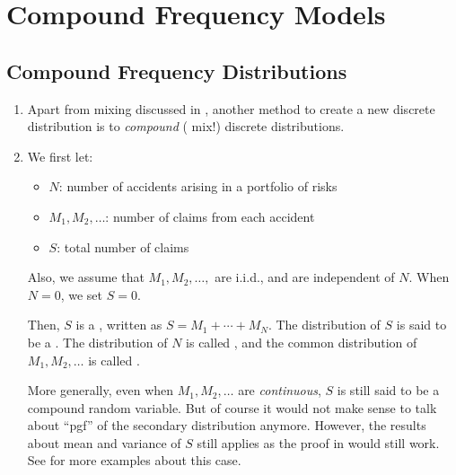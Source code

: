 \section{Compound Frequency Models}
\label{sect:cpd-freq-model}
\subsection{Compound Frequency Distributions}
\begin{enumerate}
\item Apart from mixing discussed in , another method
to create a new discrete distribution is to \emph{compound} (
mix!) discrete distributions.

\item \label{it:cpd-dist-as-total-claims}
We first let:
\begin{itemize}
\item \(N\): number of accidents arising in a portfolio of risks
\item \(M_1,M_2,\dotsc\): number of claims from each accident
\item \(S\): total number of claims
\end{itemize}
Also, we assume that \(M_1,M_2,\dotsc,\) are i.i.d., and are independent of \(N\). When \(N=0\), we set \(S=0\).

Then, \(S\) is a , written as
\(S=M_1+\dotsb+M_N\). The distribution of \(S\) is said to be a . The distribution of \(N\) is called ,
and the common distribution of \(M_1,M_2,\dotsc\) is called .

\begin{note}
More generally, even when \(M_1,M_2,\dotsc\) are \emph{continuous},
\(S\) is still said to be a compound random variable. But of course
it would not make sense to talk about ``pgf'' of the secondary
distribution anymore. However, the results about mean and variance
of \(S\) still applies as the proof in
 would still work. See  for more examples about this case.
\end{note}



\end{enumerate}

